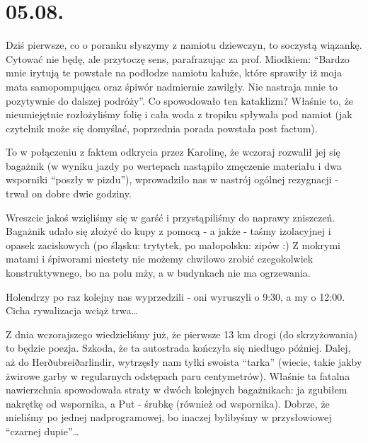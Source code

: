 \chapter*{05.08.}

Dziś pierwsze, co o poranku słyszymy z namiotu dziewczyn, to soczystą wiązankę. Cytować nie będę, ale przytoczę sens, parafrazując za prof. Miodkiem: “Bardzo mnie irytują te powstałe na podłodze namiotu kałuże, które sprawiły iż moja mata samopompująca oraz śpiwór nadmiernie zawilgły. Nie nastraja mnie to pozytywnie do dalszej podróży”. Co spowodowało ten kataklizm? Właśnie to, że nieumiejętnie rozłożyliśmy folię i cała woda z tropiku spływała pod namiot (jak czytelnik może się domyślać, poprzednia porada powstała post factum).

To w połączeniu z faktem odkrycia przez Karolinę, że wczoraj rozwalił jej się bagażnik (w wyniku jazdy po wertepach nastąpiło zmęczenie materiału i dwa wsporniki “poszły w pizdu”), wprowadziło nas w nastrój ogólnej rezygnacji - trwał on dobre dwie godziny.

Wreszcie jakoś wzięliśmy się w garść i przystąpiliśmy do naprawy zniszczeń. Bagażnik udało się złożyć do kupy z pomocą - a jakże - taśmy izolacyjnej i opasek zaciskowych (po śląsku: trytytek, po małopolsku: zipów :) Z mokrymi matami i śpiworami niestety nie możemy chwilowo zrobić czegokolwiek konstruktywnego, bo na polu mży, a w budynkach nie ma ogrzewania.

Holendrzy po raz kolejny nas wyprzedzili - oni wyruszyli o 9:30, a my o 12:00. Cicha rywalizacja wciąż trwa…

Z dnia wczorajszego wiedzieliśmy już, że pierwsze 13 km drogi (do skrzyżowania) to będzie poezja. Szkoda, że ta autostrada kończyła się niedługo później. Dalej, aż do Herðubreiðarlindir, wytrzęsły nam tyłki swoista “tarka” (wiecie, takie jakby żwirowe garby w regularnych odstępach paru centymetrów). Właśnie ta fatalna nawierzchnia spowodowała straty w dwóch kolejnych bagażnikach: ja zgubiłem nakrętkę od wspornika, a Put - śrubkę (również od wspornika). Dobrze, że mieliśmy po jednej nadprogramowej, bo inaczej bylibyśmy w przysłowiowej “czarnej dupie”…



